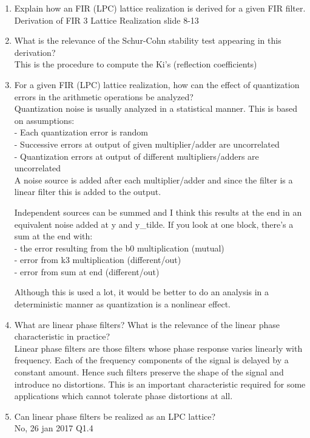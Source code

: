 \documentclass[
  a4paper,
  ,captions=tableheading
]{scrartcl}
\begin{document}
\begin{enumerate}
\def\labelenumi{\arabic{enumi}.}
\item
  Explain how an FIR (LPC) lattice realization is derived for a given
  FIR filter. Derivation of FIR 3 Lattice Realization slide 8-13\\
\item
  What is the relevance of the Schur-Cohn stability test appearing in
  this derivation?\\
  This is the procedure to compute the Ki's (reflection coefficients)\\
\item
  For a given FIR (LPC) lattice realization, how can the effect of
  quantization errors in the arithmetic operations be analyzed?\\
  Quantization noise is usually analyzed in a statistical manner. This
  is based on assumptions:\\
  - Each quantization error is random\\
  - Successive errors at output of given multiplier/adder are
  uncorrelated\\
  - Quantization errors at output of different multipliers/adders are
  uncorrelated\\
  A noise source is added after each multiplier/adder and since the
  filter is a linear filter this is added to the output.

  Independent sources can be summed and I think this results at the end
  in an equivalent noise added at y and y\_tilde. If you look at one
  block, there's a sum at the end with:\\
  - the error resulting from the b0 multiplication (mutual)\\
  - error from k3 multiplication (different/out)\\
  - error from sum at end (different/out)

  Although this is used a lot, it would be better to do an analysis in a
  deterministic manner as quantization is a nonlinear effect.\\
\item
  What are linear phase filters? What is the relevance of the linear
  phase characteristic in practice?\\
  Linear phase filters are those filters whose phase response varies
  linearly with frequency. Each of the frequency components of the
  signal is delayed by a constant amount. Hence such filters preserve
  the shape of the signal and introduce no distortions. This is an
  important characteristic required for some applications which cannot
  tolerate phase distortions at all.\\
\item
  Can linear phase filters be realized as an LPC lattice?\\
  No, 26 jan 2017 Q1.4
\end{enumerate}
\end{document}
